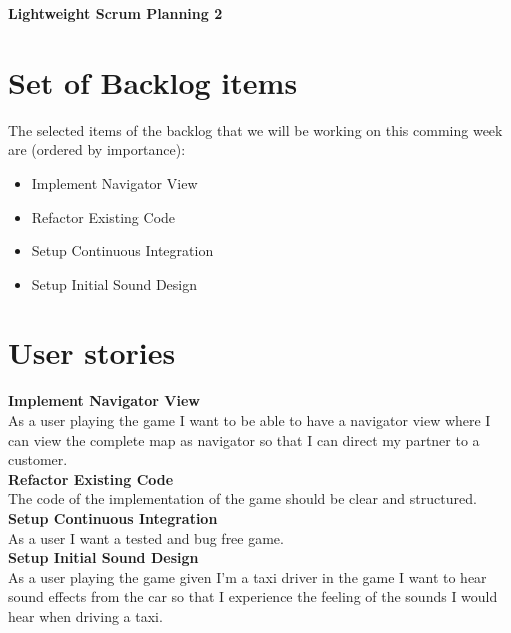 \documentclass{article}
\begin{document}
\begin{minipage}[H]{\textwidth}
\vspace{0.3cm}
		\begin{center}
		\vspace{0.3cm}
			\Huge{\textbf{Lightweight Scrum Planning 2}}\\
		\vspace{0.3cm}	
		\vspace{0.7cm}		
		\end{center}
	\end{minipage}

\section*{Set of Backlog items}
The selected items of the backlog that we will be working on this comming week  are (ordered by importance):
\begin{itemize}
	\item Implement Navigator View
	\item Refactor Existing Code
	\item Setup Continuous Integration
	\item Setup Initial Sound Design
\end{itemize}

\section*{User stories}
\textbf{Implement Navigator View} \\
As a user playing the game I want to be able to have a navigator view where I can view the complete map as navigator so that I can direct my partner to a customer. \\
\newline
\textbf{Refactor Existing Code} \\
The code of the implementation of the game should be clear and structured. \\
\newline
\textbf{Setup Continuous Integration} \\
As a user I want a tested and bug free game. \\
\newline
\textbf{Setup Initial Sound Design} \\
As a user playing the game given I'm a taxi driver in the game I want to hear sound effects from the car so that I experience the feeling of the sounds I would hear when driving a taxi.
\end{document}
